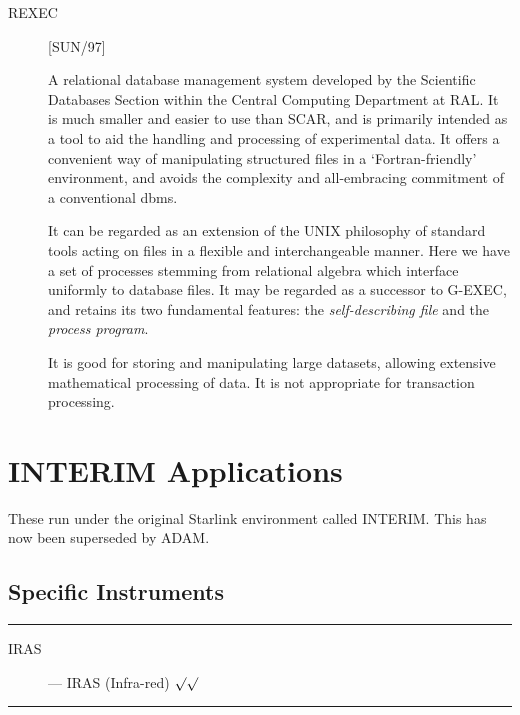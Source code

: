 \begin{description}

\item [REXEC] \hfill [SUN/97]

A relational database management system developed by the Scientific Databases
Section within the Central Computing Department at RAL.
It is much smaller and easier to use than SCAR, and is primarily intended as a
tool to aid the handling and processing of experimental data.
It offers a convenient way of manipulating structured files in a
`Fortran-friendly' environment, and avoids the complexity and all-embracing
commitment of a conventional dbms.

It can be regarded as an extension of the UNIX philosophy of standard tools
acting on files in a flexible and interchangeable manner.
Here we have a set of processes stemming from relational algebra which
interface uniformly to database files.
It may be regarded as a successor to G-EXEC, and retains its two fundamental
features: the {\em self-describing file} and the {\em process program}.

It is good for storing and manipulating large datasets, allowing extensive
mathematical processing of data.
It is not appropriate for transaction processing.

\end{description}

\newpage

\section{INTERIM Applications}

These run under the original Starlink environment called INTERIM.
This has now been superseded by ADAM.

\subsection{Specific Instruments}

\rule{\textwidth}{0.5mm}
\begin{description}
\begin{description}
\item [IRAS] --- IRAS (Infra-red) \hfill $\surd\surd$
\end{description}
\end{description}
\rule{\textwidth}{0.5mm}

